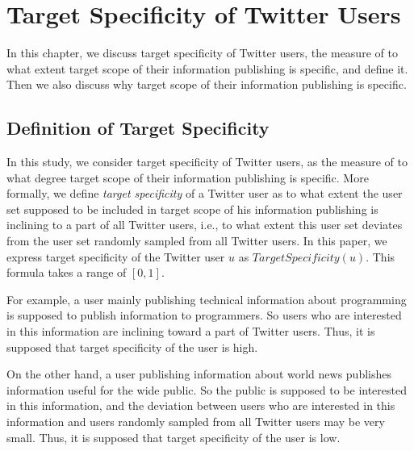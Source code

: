 \section{Target Specificity of Twitter Users}
\label{sec:Target Specificity}

In this chapter, we discuss target specificity of Twitter users, the
measure of to what extent target scope of their information publishing
is specific, and define it.  Then we also discuss why target scope of
their information publishing is specific.

\subsection{Definition of Target Specificity}
\label{subsec:Definition}

In this study, we consider target specificity of Twitter users, as
the measure of to what degree target scope of their information publishing is
specific.  More formally, we define \emph{target specificity} of a
Twitter user as to what extent the user set supposed to be included in
target scope of his information publishing is inclining to a
part of all Twitter users, i.e., to what extent this user set deviates
from the user set randomly sampled from all Twitter users.  In this
paper, we express target specificity of the Twitter user $u$ as
$\mathit{TargetSpecificity}(u)$. This formula takes a range of $[0, 1]$.

For example, a user mainly publishing technical information about
programming is supposed to publish information to programmers.  So
users who are interested in this information are inclining toward a part
of Twitter users.  Thus, it is supposed that target specificity of
the user is high.

On the other hand, a user publishing information about world news
publishes information useful for the wide public.  So the public is
supposed to be interested in this information, and the deviation between
users who are interested in this information and users randomly sampled
from all Twitter users may be very small.  Thus, it is supposed
that target specificity of the user is low.

